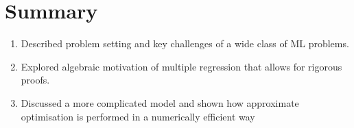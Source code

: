 \documentclass[a4paper]{article}
\theoremstyle{break}
\begin{document}
\section{Summary}
\begin{enumerate}
    \item Described problem setting and key challenges of a wide class of ML problems.
    \item Explored algebraic motivation of multiple regression that allows for rigorous proofs.
    \item Discussed a more complicated model and shown how approximate optimisation is performed in a numerically efficient way
\end{enumerate}

% 
% 
\end{document}
